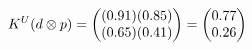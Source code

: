 \documentclass[preview]{standalone}
\begin{document}
\begin{align*}
\special{dvisvgm:raw <g id='unique000'>}K^U(d \otimes p) = \begin{pmatrix} (0.91)(0.85) \\ (0.65)(0.41) \end{pmatrix} = \begin{pmatrix} 0.77 \\ 0.26 \end{pmatrix}\special{dvisvgm:raw </g>}
\end{align*}
\end{document}
